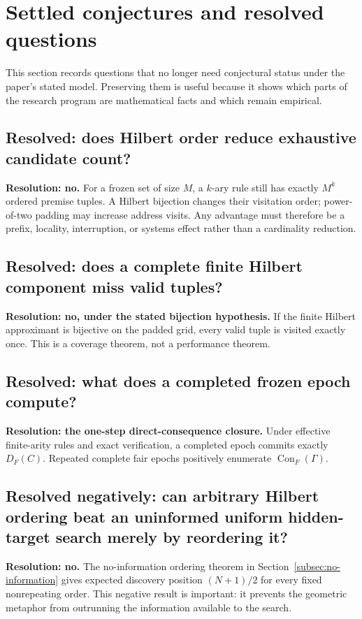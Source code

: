 \documentclass[11pt]{article}
\theoremstyle{hilberttheorem}
\begin{document}
\section{Settled conjectures and resolved questions}\label{sec:settled}
This section records questions that no longer need conjectural status under the paper's stated model. Preserving them is useful because it shows which parts of the research program are mathematical facts and which remain empirical.

\subsection{Resolved: does Hilbert order reduce exhaustive candidate count?}
\textbf{Resolution: no.} For a frozen set of size $M$, a $k$-ary rule still has exactly $M^k$ ordered premise tuples. A Hilbert bijection changes their visitation order; power-of-two padding may increase address visits. Any advantage must therefore be a prefix, locality, interruption, or systems effect rather than a cardinality reduction.

\subsection{Resolved: does a complete finite Hilbert component miss valid tuples?}
\textbf{Resolution: no, under the stated bijection hypothesis.} If the finite Hilbert approximant is bijective on the padded grid, every valid tuple is visited exactly once. This is a coverage theorem, not a performance theorem.

\subsection{Resolved: what does a completed frozen epoch compute?}
\textbf{Resolution: the one-step direct-consequence closure.} Under effective finite-arity rules and exact verification, a completed epoch commits exactly $D_F(C)$. Repeated complete fair epochs positively enumerate $\operatorname{Con}_F(\Gamma)$.

\subsection{Resolved negatively: can arbitrary Hilbert ordering beat an uninformed uniform hidden-target search merely by reordering it?}
\textbf{Resolution: no.} The no-information ordering theorem in Section~\ref{subsec:no-information} gives expected discovery position $(N+1)/2$ for every fixed nonrepeating order. This negative result is important: it prevents the geometric metaphor from outrunning the information available to the search.
\end{document}
